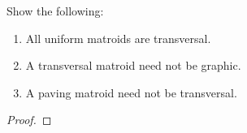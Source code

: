 \prob
{
    Show the following:
    \begin{enumerate}[label=(\roman*)]
        \item   All uniform matroids are transversal.
        \item   A transversal matroid need not be graphic.
        \item   A paving matroid need not be transversal.
    \end{enumerate}
}
\begin{proof}
\end{proof}